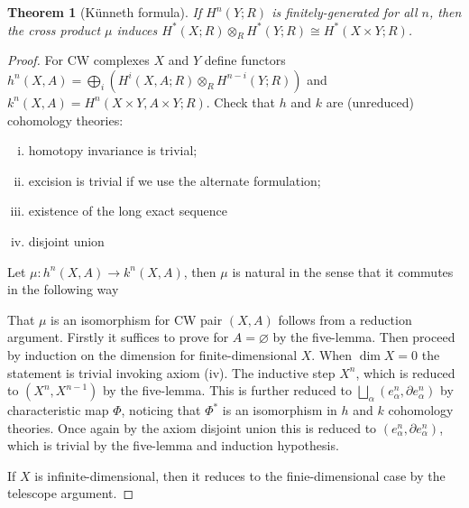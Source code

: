 \documentclass[11pt]{article}
\theoremstyle{definition}
\theoremstyle{plain}
\newtheorem{theorem}{Theorem}[section]
\newcommand{\1}{\mathbf{1}}
\begin{document}
\begin{theorem}[Künneth formula]
If $H^n(Y;R)$ is finitely-generated for all $n$, then the cross product $\mu$ induces $H^\ast(X;R)\otimes_RH^\ast(Y;R)\cong H^\ast(X\times Y;R)$.
\end{theorem}
\begin{proof}
For CW complexes $X$ and $Y$ define functors $h^n(X,A)=\bigoplus_i(H^i(X,A;R)\otimes_RH^{n-i}(Y;R))$ and $k^n(X,A)=H^n(X\times Y,A\times Y;R)$. Check that $h$ and $k$ are (unreduced) cohomology theories:\begin{enumerate}[(i)]
    \item homotopy invariance is trivial;
    \item excision is trivial if we use the alternate formulation;
    \item existence of the long exact sequence
    \item disjoint union
\end{enumerate}

Let $\mu:h^n(X,A)\to k^n(X,A)$, then $\mu$ is natural in the sense that it commutes in the following way\medbreak

That $\mu$ is an isomorphism for CW pair $(X,A)$ follows from a reduction argument. Firstly it suffices to prove for $A=\varnothing$ by the five-lemma. Then proceed by induction on the dimension for finite-dimensional $X$. When $\dim X=0$ the statement is trivial invoking axiom (iv). The inductive step $X^n$, which is reduced to $(X^n,X^{n-1})$ by the five-lemma. This is further reduced to $\bigsqcup_\alpha(e_\alpha^n,\partial e^n_\alpha)$ by characteristic map $\Phi$, noticing that $\Phi^\ast$ is an isomorphism in $h$ and $k$ cohomology theories. Once again by the axiom disjoint union this is reduced to $(e_\alpha^n,\partial e^n_\alpha)$, which is trivial by the five-lemma and induction hypothesis.\medbreak

If $X$ is infinite-dimensional, then it reduces to the finie-dimensional case by the telescope argument.


\end{proof}
\end{document}

